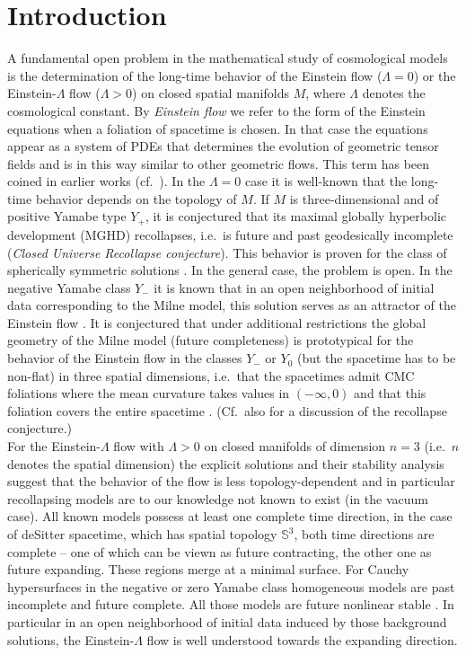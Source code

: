 \documentclass[a4paper,10pt]{article}
\theoremstyle{plain}
\theoremstyle{definition}
\theoremstyle{remark}
\theoremstyle{plain}
\newcommand{\La}{\Lambda}
\numberwithin{equation}{section}
\begin{document}
\section{Introduction}
A fundamental open problem in the mathematical study of cosmological models is the determination of the long-time behavior of the Einstein flow ($\La=0$) or the Einstein-$\La$ flow ($\La>0$) on closed spatial manifolds $M$, where $\La$ denotes the cosmological constant. By \emph{Einstein flow} we refer to the form of the Einstein equations when a foliation of spacetime is chosen. In that case the equations appear as a system of PDEs that determines the evolution of geometric tensor fields and is in this way similar to other geometric flows. This term has been coined in earlier works (cf.~\cite{AnMo11}).  In the $\La=0$ case it is well-known that the long-time behavior depends on the topology of $M$. If $M$ is three-dimensional and of positive Yamabe type $Y_+$, it is conjectured that its maximal globally hyperbolic development (MGHD) recollapses, i.e.~is future and past geodesically incomplete \cite{BaGaTi86} (\emph{Closed Universe Recollapse conjecture}). This behavior is proven for the class of spherically symmetric solutions \cite{BuRe96,He02}. In the general case, the problem is open. In the negative Yamabe class $Y_-$ it is known that in an open neighborhood of initial data corresponding to the Milne model, this solution serves as an attractor of the Einstein flow \cite{AnMo11}. It is conjectured that under additional restrictions the global geometry of the Milne model (future completeness) is prototypical for the behavior of the Einstein flow in the classes $Y_-$ or $Y_0$ (but the spacetime has to be non-flat) in three spatial dimensions, i.e.~that the spacetimes admit CMC foliations where the mean curvature takes values in $(-\infty,0)$ and that this foliation covers the entire spacetime \cite{Re96}. (Cf.~also \cite{An01} for a discussion of the recollapse conjecture.)\\
For the Einstein-$\La$ flow with $\La>0$ on closed manifolds of dimension $n=3$ (i.e.~$n$ denotes the spatial dimension) the explicit solutions and their stability analysis suggest that the behavior of the flow is less topology-dependent and in particular recollapsing models are to our knowledge not known to exist (in the vacuum case). All known models possess at least one complete time direction, in the case of deSitter spacetime, which has spatial topology $\mathbb S^3$, both time directions are complete -- one of which can be viewn as future contracting, the other one as future expanding. These regions merge at a minimal surface. For Cauchy hypersurfaces in the negative or zero Yamabe class homogeneous models are past incomplete and future complete. All those models are future nonlinear stable \cite{Ri08}. In particular in an open neighborhood of initial data induced by those background solutions, the Einstein-$\La$ flow is well understood towards the expanding direction.
\end{document}

